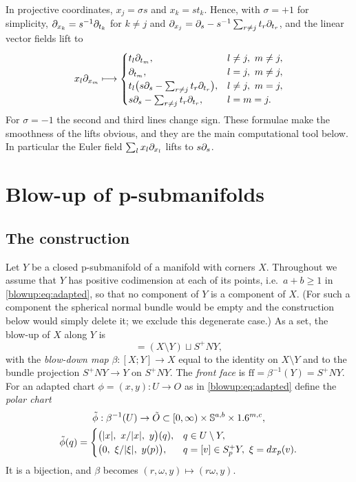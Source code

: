 In projective coordinates, $x_j=\sigma s$ and $x_k=st_k$. Hence, with $\sigma=+1$ for
simplicity, $\partial_{x_k}=s^{-1}\partial_{t_k}$ for $k\ne j$ and
$\partial_{x_j}=\partial_s-s^{-1}\sum_{r\ne j}t_r\partial_{t_r}$, and the linear vector fields lift to
\begin{equation}\label{blowup:eq:proj-lifts}
  x_l\partial_{x_m}\longmapsto
  \begin{cases}
    t_l\partial_{t_m}, & l\ne j,\ m\ne j,\\
    \partial_{t_m}, & l=j,\ m\ne j,\\
    t_l\big(s\partial_s-\sum_{r\ne j}t_r\partial_{t_r}\big), & l\ne j,\ m=j,\\
    s\partial_s-\sum_{r\ne j}t_r\partial_{t_r}, & l=m=j.
  \end{cases}
\end{equation}
For $\sigma=-1$ the second and third lines change sign. These formulae make the
smoothness of the lifts obvious, and they are the main computational tool below. In
particular the Euler field $\sum_lx_l\partial_{x_l}$ lifts to $s\partial_s$.

\section{Blow-up of p-submanifolds}\label{blowup:sec:psub}

\subsection{The construction}
Let $Y$ be a closed p-submanifold of a manifold with corners $X$. Throughout we assume
that $Y$ has positive codimension at each of its points, i.e.\ $a+b\ge1$ in
\eqref{blowup:eq:adapted}, so that no component of $Y$ is a component of $X$. (For such a
component the spherical normal bundle would be empty and the construction below would
simply delete it; we exclude this degenerate case.) As a set, the
blow-up of $X$ along $Y$ is
\begin{equation*}
  [X;Y]=(X\setminus Y)\sqcup S^+NY,
\end{equation*}
with the \emph{blow-down map} $\beta:[X;Y]\to X$ equal to the identity on $X\setminus Y$
and to the bundle projection $S^+NY\to Y$ on $S^+NY$. The \emph{front face} is
$\mathrm{ff}=\beta^{-1}(Y)=S^+NY$. For an adapted chart $\phi=(x,y):U\to O$ as in
\eqref{blowup:eq:adapted} define the \emph{polar chart}
\begin{gather*}
  \tilde\phi:\beta^{-1}(U)\to\tilde O\subset[0,\infty)\times\Sphere^{a,b}\times\R^{m,c},
  \\
  \tilde\phi(q)=\begin{cases}\big(\abs x,\ x/\abs x,\ y\big)(q),& q\in U\setminus Y,\\
  \big(0,\ \xi/\abs\xi,\ y(p)\big),&q=[v]\in S^+_pY,\ \xi=dx_p(v).\end{cases}
\end{gather*}
It is a bijection, and $\beta$ becomes $(r,\omega,y)\mapsto(r\omega,y)$.

